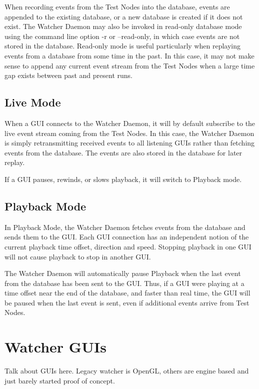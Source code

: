 \documentclass{article}
\begin{document}
When recording events from the Test Nodes into the database, events are
appended to the existing database, or a new database is created if it does not
exist.  The Watcher Daemon may also be invoked in read-only database mode using
the command line option -r or --read-only, in which case events are not stored
in the database.  Read-only mode is useful particularly when replaying events
from a database from some time in the past.  In this case, it may not make
sense to append any current event stream from the Test Nodes when a large time
gap exists between past and present runs.

\subsection{Live Mode}

When a GUI connects to the Watcher Daemon, it will by default subscribe to the
live event stream coming from the Test Nodes.  In this case, the Watcher Daemon
is simply retransmitting received events to all listening GUIs rather than
fetching events from the database.  The events are also stored in the database
for later replay.

If a GUI pauses, rewinds, or slows playback, it will switch to Playback mode.

\subsection{Playback Mode}

In Playback Mode, the Watcher Daemon fetches events from the database and sends
them to the GUI.  Each GUI connection has an independent notion of the current
playback time offset, direction and speed.  Stopping playback in one GUI will
not cause playback to stop in another GUI.

The Watcher Daemon will automatically pause Playback when the last event from
the database has been sent to the GUI.  Thus, if a GUI were playing at a time
offset near the end of the database, and faster than real time, the GUI will be
paused when the last event is sent, even if additional events arrive from Test
Nodes.

\section{Watcher GUIs}

Talk about GUIs here. Legacy watcher is OpenGL, others are engine based and just barely started proof of concept.
\end{document}
